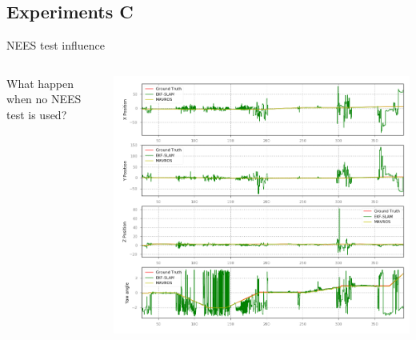 \documentclass[serif,aspectratio=169]{beamer}
\begin{document}
    \subsection{Experiments C}
    \begin{frame}{NEES test influence}
        \begin{columns}[c]
            \begin{column}{.3\textwidth}
                What happen when no NEES test is used?
            \end{column}
            \begin{column}{.7\textwidth}
                \centering
                \includegraphics[height=0.8\textheight]{Images/fig24-no-nees-test.png}
            \end{column}
        \end{columns}
    \end{frame}
\end{document}
